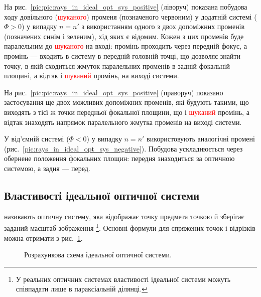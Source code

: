На рис.~\ref{pic:pic:rays_in_ideal_opt_sys_positive} (ліворуч) показана побудова ходу довільного (\textcolor{red}{шуканого}) променя (позначеного червоним) у додатній системі ($\Phi > 0$) у випадку $ n = n'$ з використанням одного з двох допоміжних променів (позначених синім і зеленим), хід яких є відомим. Кожен з цих променів буде паралельним до \textcolor{red}{шуканого} на вході: промінь \bluerayT{} проходить через передній фокус, а промінь \greenrayT{} --- входить в систему в передній головній точці, що дозволяє знайти точку, в якій сходиться жмуток паралельних променів в задній фокальній площині, а відтак і \textcolor{red}{шуканий} промінь, на виході системи.


На рис.~\ref{pic:pic:rays_in_ideal_opt_sys_positive} (праворуч) показано застосування ще двох можливих допоміжних променів, які будують такими, що виходять з тієї ж точки передньої фокальної площини, що і \textcolor{red}{шуканий} промінь, а відтак знаходять напрямок паралельного жмутка променів на
виході системи.



У від'ємній системі ($\Phi < 0$) у випадку $ n = n' $ використовують аналогічні промені (рис.~\ref{pic:rays_in_ideal_opt_sys_negative}). Побудова ускладнюється через обернене положення фокальних
площин: передня знаходиться за оптичною системою, а задня --- перед.


\subsection{Властивості ідеальної оптичної системи}

 називають оптичну систему, яка
відображає точку предмета точкою й зберігає заданий масштаб
зображення \footnote{У реальних оптичних системах властивості ідеальної системи можуть співпадати лише в параксіальній ділянці.}. Основні формули для спряжених точок і відрізків можна отримати з рис.~\ref{pic:Ideal_opt_sys}.


\begin{figure}[h!]\centering
	
	\caption{Розрахункова схема ідеальної оптичної системи.}
	\label{pic:Ideal_opt_sys}
\end{figure}

